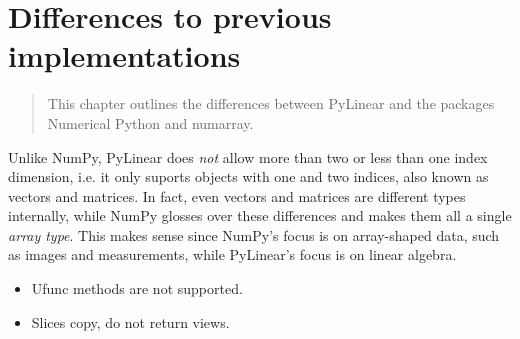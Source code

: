 \chapter{Differences to previous implementations}
\label{cha:diff-pylinear-numpy}

\begin{quote}
   This chapter outlines the differences between PyLinear and the packages
   Numerical Python and numarray.
\end{quote}

Unlike NumPy, PyLinear does \emph{not} allow more than two or less
than one index dimension, i.e. it only suports objects with one and
two indices, also known as vectors and matrices. In fact, even vectors
and matrices are different types internally, while NumPy glosses over
these differences and makes them all a single \emph{array type}. This
makes sense since NumPy's focus is on array-shaped data, such as
images and measurements, while PyLinear's focus is on linear algebra.

\begin{itemize}
  \item Ufunc methods are not supported.
  \item Slices copy, do not return views.
\end{itemize}
